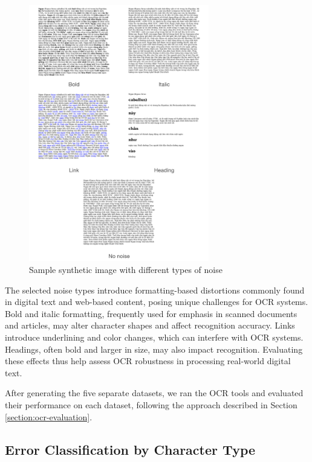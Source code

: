\documentclass[12pt,oneside]{memoir}
\begin{document}
\begin{figure}[ht]
    \centering
    \includegraphics[width=0.7\textwidth]{images/noises.png}
    \caption{Sample synthetic image with different types of noise}
    \label{figure:noises}
\end{figure}

The selected noise types introduce formatting-based distortions commonly found in digital text and web-based content, posing unique challenges for OCR systems.
Bold and italic formatting, frequently used for emphasis in scanned documents and articles, may alter character shapes and affect recognition accuracy.
Links introduce underlining and color changes, which can interfere with OCR systems.
Headings, often bold and larger in size, may also impact recognition.
Evaluating these effects thus help assess OCR robustness in processing real-world digital text.

After generating the five separate datasets, we ran the OCR tools and evaluated their performance on each dataset, following the approach described in Section \ref{section:ocr-evaluation}.

\subsection{Error Classification by Character Type}
\end{document}
